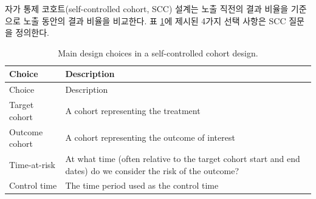 \documentclass[]{book}
\begin{document}
자가 통제 코호트(self-controlled cohort, SCC) 설계\citep{ryan_2013}는 노출 직전의 결과 비율을 기준으로 노출 동안의 결과 비율을 비교한다. 표 \ref{tab:sccChoices}에 제시된 4가지 선택 사항은 SCC 질문을 정의한다. 

\begin{longtable}[]{@{}ll@{}}
\caption{\label{tab:sccChoices} Main design choices in a self-controlled cohort design.}\tabularnewline
\toprule
\begin{minipage}[b]{0.23\columnwidth}\raggedright
Choice\strut
\end{minipage} & \begin{minipage}[b]{0.72\columnwidth}\raggedright
Description\strut
\end{minipage}\tabularnewline
\midrule
\endfirsthead
\toprule
\begin{minipage}[b]{0.23\columnwidth}\raggedright
Choice\strut
\end{minipage} & \begin{minipage}[b]{0.72\columnwidth}\raggedright
Description\strut
\end{minipage}\tabularnewline
\midrule
\endhead
\begin{minipage}[t]{0.23\columnwidth}\raggedright
Target cohort\strut
\end{minipage} & \begin{minipage}[t]{0.72\columnwidth}\raggedright
A cohort representing the treatment\strut
\end{minipage}\tabularnewline
\begin{minipage}[t]{0.23\columnwidth}\raggedright
Outcome cohort\strut
\end{minipage} & \begin{minipage}[t]{0.72\columnwidth}\raggedright
A cohort representing the outcome of interest\strut
\end{minipage}\tabularnewline
\begin{minipage}[t]{0.23\columnwidth}\raggedright
Time-at-risk\strut
\end{minipage} & \begin{minipage}[t]{0.72\columnwidth}\raggedright
At what time (often relative to the target cohort start and end dates) do we consider the risk of the outcome?\strut
\end{minipage}\tabularnewline
\begin{minipage}[t]{0.23\columnwidth}\raggedright
Control time\strut
\end{minipage} & \begin{minipage}[t]{0.72\columnwidth}\raggedright
The time period used as the control time\strut
\end{minipage}\tabularnewline
\bottomrule
\end{longtable}
\end{document}
